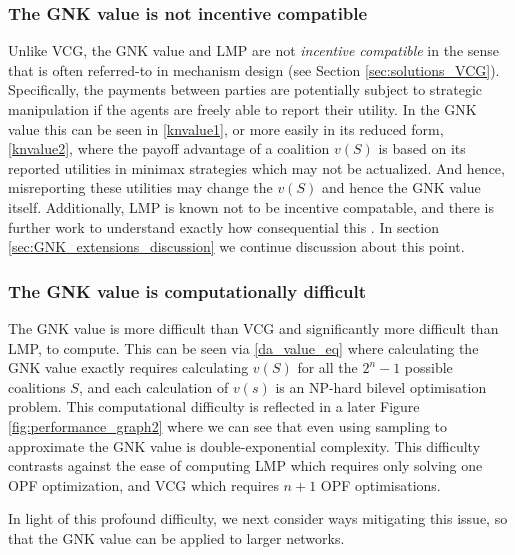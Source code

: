 \subsubsection*{The GNK value is not incentive compatible}
Unlike VCG, the GNK value and LMP are not \emph{incentive compatible} in the sense that is often referred-to in mechanism design (see Section \ref{sec:solutions_VCG}).
Specifically, the payments between parties are potentially subject to strategic manipulation if the agents are freely able to report their utility.
In the GNK value this can be seen in \eqref{knvalue1}, or more easily in its reduced form, \eqref{knvalue2}, where the payoff advantage of a coalition $v(S)$ is based on its reported utilities in minimax strategies which may not be actualized.
And hence, misreporting these utilities may change the $v(S)$ and hence the GNK value itself.
Additionally, LMP is known not to be incentive compatable, and there is further work to understand exactly how consequential this \cite{8054716}.
In section \ref{sec:GNK_extensions_discussion} we continue discussion about this point.

\subsubsection*{The GNK value is computationally difficult}
The GNK value is more difficult than VCG and significantly more difficult than LMP, to compute.
This can be seen via \eqref{da_value_eq} where calculating the GNK value exactly requires calculating $v(S)$ for all the $2^n-1$ possible coalitions $S$, and each calculation of $v(s)$ is an NP-hard bilevel optimisation problem.
This computational difficulty is reflected in a later Figure \ref{fig:performance_graph2} where we can see that even using sampling to approximate the GNK value is double-exponential complexity. 
This difficulty contrasts against the ease of computing LMP which requires only solving one OPF optimization, and VCG which requires $n+1$ OPF optimisations.

In light of this profound difficulty, we next consider ways mitigating this issue, so that the GNK value can be applied to larger networks.


